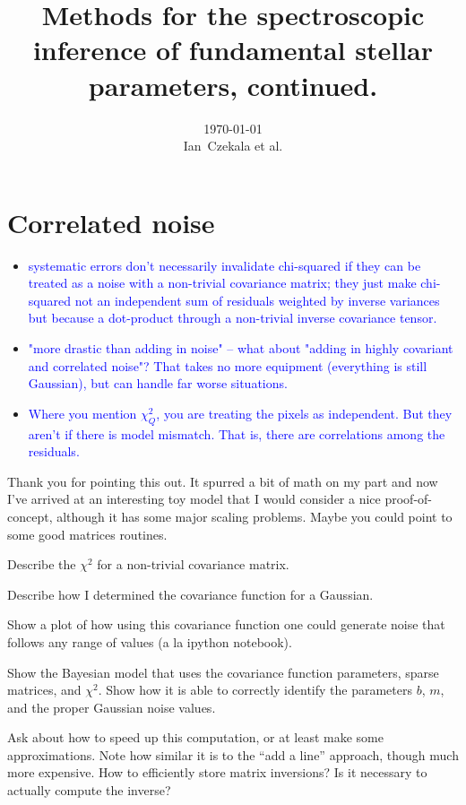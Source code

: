 \documentclass[preprint]{aastex} %
\newcommand{\hcom}[1]{ \textcolor{Blue}{#1}}
\begin{document}
\title{Methods for the spectroscopic inference of fundamental stellar parameters, continued.}
\author{\today{}\\
\medskip
Ian~Czekala et al.
}


\section{Correlated noise}
\begin{itemize}
  \item \hcom{systematic errors don't necessarily invalidate chi-squared if they can be treated as a noise with a non-trivial covariance matrix; they just make chi-squared not an independent sum of residuals weighted by inverse variances but because a dot-product through a non-trivial inverse covariance tensor.}
  \item \hcom{"more drastic than adding in noise" -- what about "adding in highly covariant and correlated noise"? That takes no more equipment (everything is still Gaussian), but can handle far worse situations.}
  \item \hcom{Where you mention $\chi^2_Q$, you are treating the pixels as independent. But they aren't if there is model mismatch. That is, there are correlations among the residuals.}
\end{itemize}


Thank you for pointing this out. It spurred a bit of math on my part and now I've arrived at an interesting toy model that I would consider a nice proof-of-concept, although it has some major scaling problems. Maybe you could point to some good matrices routines.

Describe the $\chi^2$ for a non-trivial covariance matrix.

Describe how I determined the covariance function for a Gaussian. 

Show a plot of how using this covariance function one could generate noise that follows any range of values (a la ipython notebook).

Show the Bayesian model that uses the covariance function parameters, sparse matrices, and $\chi^2$. Show how it is able to correctly identify the parameters $b$, $m$, and the proper Gaussian noise values.

Ask about how to speed up this computation, or at least make some approximations. Note how similar it is to the ``add a line'' approach, though much more expensive. How to efficiently store matrix inversions? Is it necessary to actually compute the inverse?
\end{document}
